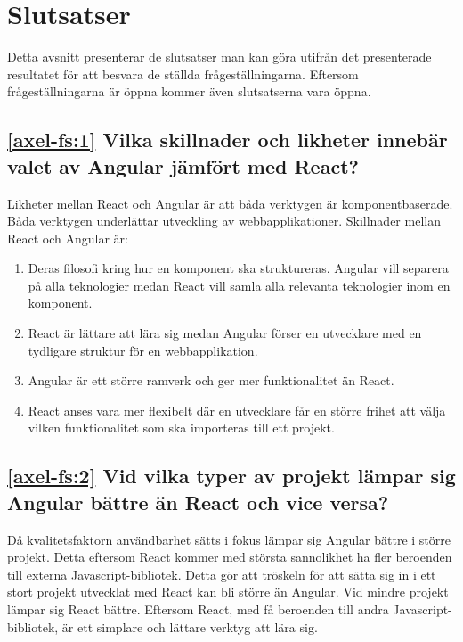 \section{Slutsatser}
\label{sec:axel-conclusion}

Detta avsnitt presenterar de slutsatser man kan göra utifrån det presenterade resultatet för att besvara de ställda frågeställningarna. Eftersom frågeställningarna är öppna kommer även slutsatserna vara öppna.

\subsection*{\ref{axel-fs:1} Vilka skillnader och likheter innebär valet av Angular jämfört med React?}
Likheter mellan React och Angular är att båda verktygen är komponentbaserade. Båda verktygen underlättar utveckling av webbapplikationer. Skillnader mellan React och Angular är:
\begin{enumerate}
    \item Deras filosofi kring hur en komponent ska struktureras. Angular vill separera på alla teknologier medan React vill samla alla relevanta teknologier inom en komponent.

    \item React är lättare att lära sig medan Angular förser en utvecklare med en tydligare struktur för en webbapplikation.

    \item Angular är ett större ramverk och ger mer funktionalitet än React.

    \item React anses vara mer flexibelt där en utvecklare får en större frihet att välja vilken funktionalitet som ska importeras till ett projekt.
    
\end{enumerate}

\subsection*{\ref{axel-fs:2} Vid vilka typer av projekt lämpar sig Angular bättre än React och vice versa?}
Då kvalitetsfaktorn användbarhet sätts i fokus lämpar sig Angular bättre i större projekt. Detta eftersom React kommer med största sannolikhet ha fler beroenden till externa Javascript-bibliotek. Detta gör att tröskeln för att sätta sig in i ett stort projekt utvecklat med React kan bli större än Angular. Vid mindre projekt lämpar sig React bättre. Eftersom React, med få beroenden till andra Javascript-bibliotek, är ett simplare och lättare verktyg att lära sig.
 
